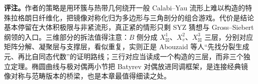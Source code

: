 {\textbf{评注。}作者的策略是用环簇与热带几何绕开一般 Calabi--Yau 流形上难以构造的特殊拉格朗日纤维化，把镜像对称化归为多边形与三角剖分的组合游戏。代价是结论基本停留在大体积极限与非紧流形，真正紧的情形只剩 SYZ 猜想与 Gross--Siebert 纲领的入口。三维部分的拆法值得注意：$B$ 侧分成 $X^1_{\boxtimes}$、$X^2_v$、$X^3_{\boxtimes}$ 三层，分别对应矩阵分解、凝聚层与支撑层，看似重复，实则正是 Abouzaid 等人“先找分裂生成元、再比自同态代数”的证明路线；三行对应当读成一个构造的三层，而非三个独立定理。椭圆曲线与极对偶两小节把 Batyrev 对偶放进同调框架，是连接经典镜像对称与范畴版本的桥梁，也是本章最值得细读之处。}

